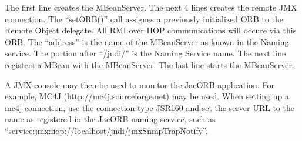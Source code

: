 The first line creates the MBeanServer. 
The next 4 lines creates the remote JMX connection. The "`setORB()"' call assignes a previously
initialized ORB to the Remote Object delegate. All RMI over IIOP communications will occure
via this ORB. The "`address"' is the name of the MBeanServer as known in the Naming service.
The portion after "`/jndi/"' is the Naming Service name.
The next line registers a MBean with the MBeanServer.
The last line starts the MBeanServer.

A JMX console may then be used to monitor the JacORB application. For example, MC4J (http://mc4j.sourceforge.net) may be used. When setting up a mc4j connection, use the connection type JSR160 and set the server URL to the name as registered in the JacORB naming service, such as 
"`service:jmx:iiop://localhost/jndi/jmxSnmpTrapNotify"'.

